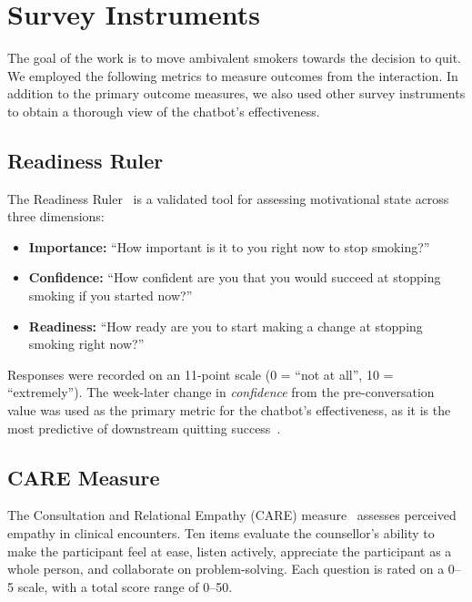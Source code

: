 \section{Survey Instruments}
\label{subsec:survey-instruments}

The goal of the work is to move ambivalent smokers towards the decision to quit. We employed the following metrics to measure outcomes from the interaction. In addition to the primary outcome measures, we also used other survey instruments to obtain a thorough view of the chatbot's effectiveness.

\subsection{Readiness Ruler}
\label{subsec:readiness-ruler}
The Readiness Ruler~\citep{rollnick1992development} is a validated tool for assessing motivational state across three dimensions:
\begin{itemize}
    \item \textbf{Importance:} ``How important is it to you right now to stop smoking?''
    \item \textbf{Confidence:} ``How confident are you that you would succeed at stopping smoking if you started now?''
    \item \textbf{Readiness:} ``How ready are you to start making a change at stopping smoking right now?''
\end{itemize}
Responses were recorded on an 11-point scale (0 = ``not at all'', 10 = ``extremely''). The week-later change in \emph{confidence} from the pre-conversation value was used as the primary metric for the chatbot's effectiveness, as it is the most predictive of downstream quitting success~\citep{Gwaltney2009-wj,Abar2013}.

\subsection{CARE Measure}
\label{subsec:care}
The Consultation and Relational Empathy (CARE) measure~\citep{10.1093/fampra/cmh621,Bikker2015} assesses perceived empathy in clinical encounters. Ten items evaluate the counsellor's ability to make the participant feel at ease, listen actively, appreciate the participant as a whole person, and collaborate on problem-solving. Each question is rated on a 0--5 scale, with a total score range of 0--50.

